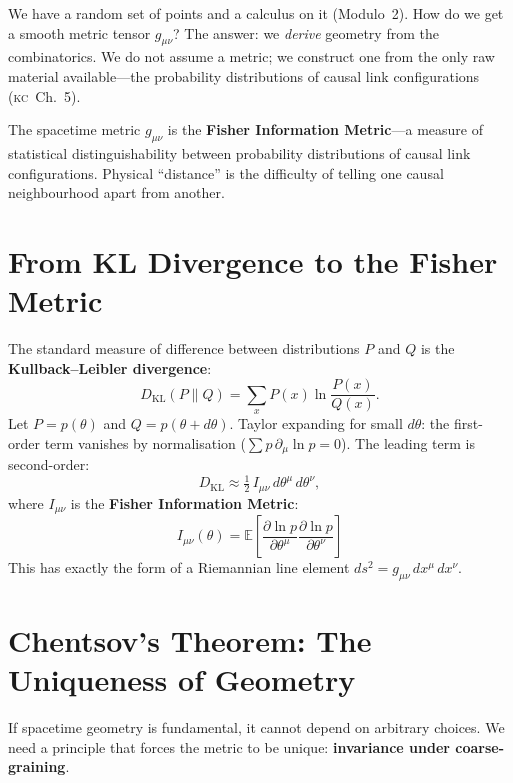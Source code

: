 \documentclass[11pt, a4paper, openany]{book}
\newcommand{\KC}[1]{\textnormal{(\textsc{kc}~#1)}}
\begin{document}
\noindent
We have a random set of points and a calculus on it (Modulo~2). How do
we get a smooth metric tensor $g_{\mu\nu}$? The answer: we \emph{derive}
geometry from the combinatorics. We do not assume a metric; we
construct one from the only raw material available---the probability
distributions of causal link configurations \KC{Ch.~5}.

\begin{result}[title={The Metric Postulate}]
The spacetime metric $g_{\mu\nu}$ is the \textbf{Fisher Information
Metric}---a measure of statistical distinguishability between
probability distributions of causal link configurations. Physical
``distance'' is the difficulty of telling one causal neighbourhood
apart from another.
\end{result}

\section{From KL Divergence to the Fisher Metric}

The standard measure of difference between distributions $P$ and $Q$ is
the \textbf{Kullback--Leibler divergence}:
\[
  D_{\mathrm{KL}}(P \| Q) = \sum_x P(x) \ln \frac{P(x)}{Q(x)}.
\]
Let $P = p(\theta)$ and $Q = p(\theta + d\theta)$. Taylor expanding for
small $d\theta$: the first-order term vanishes by normalisation
($\sum p\,\partial_\mu \ln p = 0$). The leading term is second-order:
\begin{equation}
  D_{\mathrm{KL}} \approx \tfrac{1}{2}\,I_{\mu\nu}\,d\theta^\mu\,d\theta^\nu,
\end{equation}
where $I_{\mu\nu}$ is the \textbf{Fisher Information Metric}:
\begin{equation}
  \boxed{
    I_{\mu\nu}(\theta) = \mathbb{E}\!\left[
    \frac{\partial \ln p}{\partial \theta^\mu}
    \frac{\partial \ln p}{\partial \theta^\nu}\right]
  }
\end{equation}
This has exactly the form of a Riemannian line element
$ds^2 = g_{\mu\nu}\,dx^\mu\,dx^\nu$.

\section{Chentsov's Theorem: The Uniqueness of Geometry}

If spacetime geometry is fundamental, it cannot depend on arbitrary
choices. We need a principle that forces the metric to be unique:
\textbf{invariance under coarse-graining}.
\end{document}
